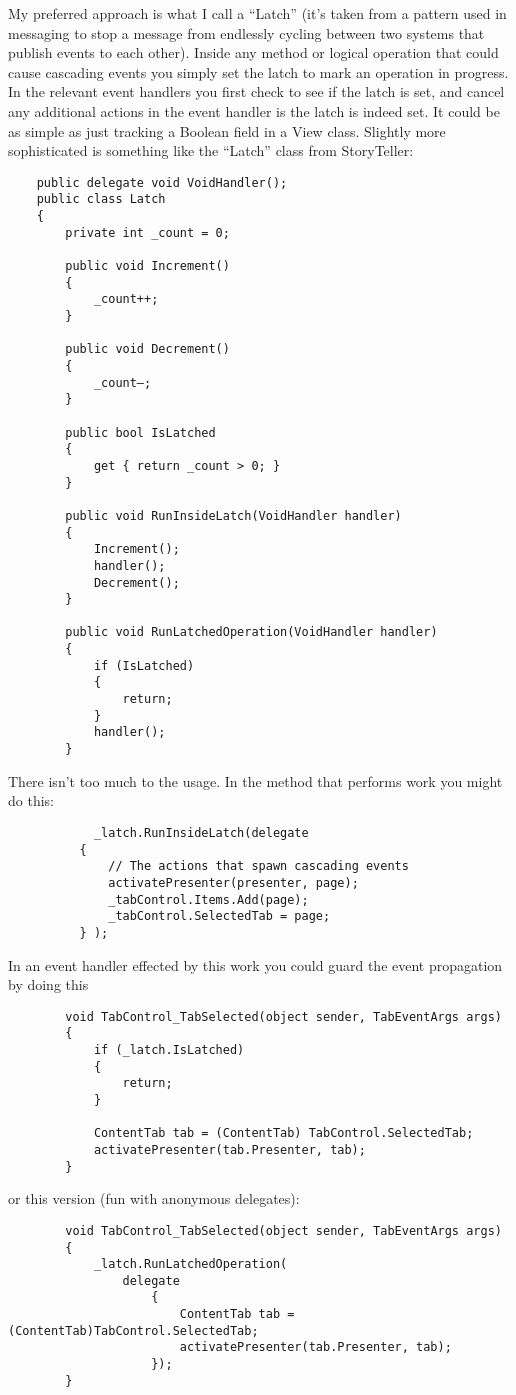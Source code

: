\documentclass{article}
\begin{document}
{My preferred approach is what I call a “Latch” (it's taken from a pattern used in messaging to stop a message from endlessly cycling between two systems that publish events to each other).  Inside any method or logical operation that could cause cascading events you simply set the latch to mark an operation in progress.  In the relevant event handlers you first check to see if the latch is set, and cancel any additional actions in the event handler is the latch is indeed set.  It could be as simple as just tracking a Boolean field in a View class.  Slightly more sophisticated is something like the “Latch” class from StoryTeller:
\newpage
\begin{lstlisting}
    public delegate void VoidHandler();
    public class Latch
    {
        private int _count = 0;

        public void Increment()
        {
            _count++;
        } 

        public void Decrement()
        {
            _count–;
        } 

        public bool IsLatched
        {
            get { return _count > 0; }
        } 

        public void RunInsideLatch(VoidHandler handler)
        {
            Increment();
            handler();
            Decrement();
        }

        public void RunLatchedOperation(VoidHandler handler)
        {
            if (IsLatched)
            {
                return;
            }
            handler();
        }
\end{lstlisting}		

There isn't too much to the usage.  In the method that performs work you might do this:
 
\begin{lstlisting}
            _latch.RunInsideLatch(delegate
		  {
			  // The actions that spawn cascading events
			  activatePresenter(presenter, page);
			  _tabControl.Items.Add(page);
			  _tabControl.SelectedTab = page;
		  } );
\end{lstlisting}				

In an event handler effected by this work you could guard the event propagation by doing this
\begin{lstlisting}
        void TabControl_TabSelected(object sender, TabEventArgs args)
        {
            if (_latch.IsLatched)
            {
                return;
            }

            ContentTab tab = (ContentTab) TabControl.SelectedTab;
            activatePresenter(tab.Presenter, tab);
        }
\end{lstlisting}		
\newpage
or this version (fun with anonymous delegates):
\begin{lstlisting}
        void TabControl_TabSelected(object sender, TabEventArgs args)
        {
            _latch.RunLatchedOperation(
                delegate
                    {
                        ContentTab tab = (ContentTab)TabControl.SelectedTab;
                        activatePresenter(tab.Presenter, tab); 
                    });
        }
\end{lstlisting}

}
\end{document}
